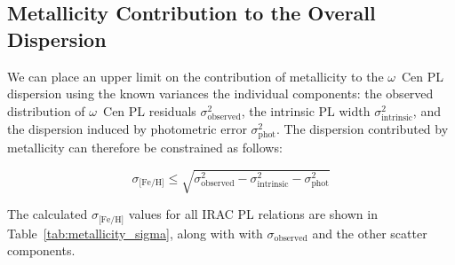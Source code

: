 \documentclass[a4paper,fleqn,usenatbib]{mnras}
\begin{document}
\subsection{Metallicity Contribution to the Overall Dispersion}
\label{sec:dispersions}

We can place an upper limit on the contribution of metallicity to the $\omega$~Cen PL dispersion using the known variances the individual components: the observed distribution of $\omega$~Cen PL residuals $\sigma_{\text{observed}}^2$, the intrinsic PL width $\sigma_{\text{intrinsic}}^2$, and the dispersion induced by photometric error $\sigma_{\text{phot}}^2$. The dispersion contributed by metallicity can therefore be constrained as follows:

\begin{equation}
\sigma_\text{[Fe/H]} \leq \sqrt{\sigma_{\text{observed}}^2 - \sigma_{\text{intrinsic}}^2 - \sigma_{\text{phot}}^2}
\end{equation}

The calculated $\sigma_\text{[Fe/H]}$ values for all IRAC PL relations are shown in Table~\ref{tab:metallicity_sigma}, along with with $\sigma_{\text{observed}}$ and the other scatter components.
\end{document}
